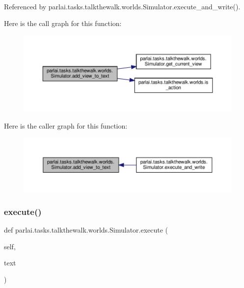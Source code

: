 Referenced by parlai.\+tasks.\+talkthewalk.\+worlds.\+Simulator.\+execute\+\_\+and\+\_\+write().

Here is the call graph for this function\+:
\nopagebreak
\begin{figure}[H]
\begin{center}
\leavevmode
\includegraphics[width=350pt]{classparlai_1_1tasks_1_1talkthewalk_1_1worlds_1_1Simulator_a7f1a6089e2650f3787e5493931a45570_cgraph}
\end{center}
\end{figure}
Here is the caller graph for this function\+:
\nopagebreak
\begin{figure}[H]
\begin{center}
\leavevmode
\includegraphics[width=350pt]{classparlai_1_1tasks_1_1talkthewalk_1_1worlds_1_1Simulator_a7f1a6089e2650f3787e5493931a45570_icgraph}
\end{center}
\end{figure}
\mbox{\label{classparlai_1_1tasks_1_1talkthewalk_1_1worlds_1_1Simulator_a4e8af8db9b10c3e5c34fdb9004d13694}} 
\subsubsection{\texorpdfstring{execute()}{execute()}}
{\footnotesize\ttfamily def parlai.\+tasks.\+talkthewalk.\+worlds.\+Simulator.\+execute (\begin{DoxyParamCaption}\item[{}]{self,  }\item[{}]{text }\end{DoxyParamCaption})}

